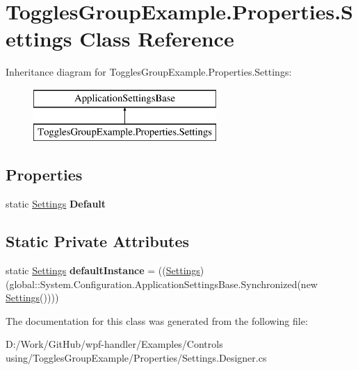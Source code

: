 \hypertarget{class_toggles_group_example_1_1_properties_1_1_settings}{}\section{Toggles\+Group\+Example.\+Properties.\+Settings Class Reference}
\label{class_toggles_group_example_1_1_properties_1_1_settings}
Inheritance diagram for Toggles\+Group\+Example.\+Properties.\+Settings\+:\begin{figure}[H]
\begin{center}
\leavevmode
\includegraphics[height=2.000000cm]{de/da5/class_toggles_group_example_1_1_properties_1_1_settings}
\end{center}
\end{figure}
\subsection*{Properties}
\begin{DoxyCompactItemize}
\item 
\mbox{\label{class_toggles_group_example_1_1_properties_1_1_settings_ab14e28d9562983a8b875d00bc96fd61f}} 
static \mbox{\hyperlink{class_toggles_group_example_1_1_properties_1_1_settings}{Settings}} {\bfseries Default}
\end{DoxyCompactItemize}
\subsection*{Static Private Attributes}
\begin{DoxyCompactItemize}
\item 
\mbox{\label{class_toggles_group_example_1_1_properties_1_1_settings_ac126e1477321bcc6adb536b5ece505ea}} 
static \mbox{\hyperlink{class_toggles_group_example_1_1_properties_1_1_settings}{Settings}} {\bfseries default\+Instance} = ((\mbox{\hyperlink{class_toggles_group_example_1_1_properties_1_1_settings}{Settings}})(global\+::\+System.\+Configuration.\+Application\+Settings\+Base.\+Synchronized(new \mbox{\hyperlink{class_toggles_group_example_1_1_properties_1_1_settings}{Settings}}())))
\end{DoxyCompactItemize}


The documentation for this class was generated from the following file\+:\begin{DoxyCompactItemize}
\item 
D\+:/\+Work/\+Git\+Hub/wpf-\/handler/\+Examples/\+Controls using/\+Toggles\+Group\+Example/\+Properties/Settings.\+Designer.\+cs\end{DoxyCompactItemize}
